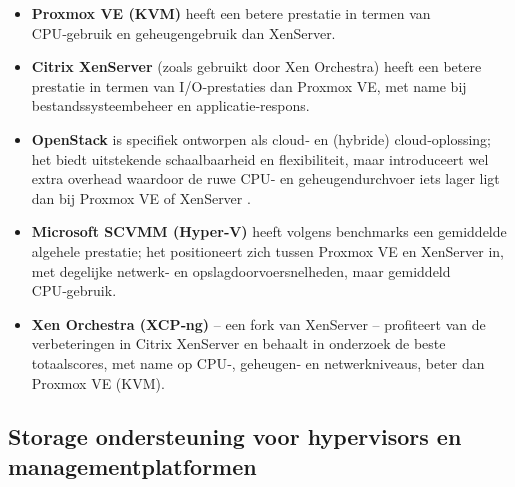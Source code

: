 \begin{itemize}
    \item \textbf{Proxmox VE (KVM)} heeft een betere prestatie in termen van CPU‑gebruik en geheugengebruik dan XenServer.
    \item \textbf{Citrix XenServer} (zoals gebruikt door Xen Orchestra) heeft een betere prestatie in termen van I/O‑prestaties dan Proxmox VE, met name bij bestandssysteembeheer en applicatie‑respons.
    \item \textbf{OpenStack} is specifiek ontworpen als cloud‑ en (hybride) cloud‑oplossing; het biedt uitstekende schaalbaarheid en flexibiliteit, maar introduceert wel extra overhead waardoor de ruwe CPU‑ en geheugendurchvoer iets lager ligt dan bij Proxmox VE of XenServer \autocite{callegati2014performance}.
    \item \textbf{Microsoft SCVMM (Hyper‑V)} heeft volgens benchmarks een gemiddelde algehele prestatie; het positioneert zich tussen Proxmox VE en XenServer in, met degelijke netwerk‑ en opslagdoorvoersnelheden, maar gemiddeld CPU‑gebruik.
    \item \textbf{Xen Orchestra (XCP‑ng)} – een fork van XenServer – profiteert van de verbeteringen in Citrix XenServer en behaalt in onderzoek de beste totaalscores, met name op CPU‑, geheugen‑ en netwerkniveaus, beter dan Proxmox VE (KVM).
\end{itemize}
                               

\subsection{Storage ondersteuning voor hypervisors en managementplatformen}\label{subsec:storageondersteuning}

